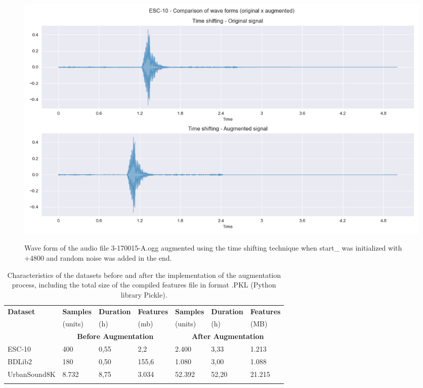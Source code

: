 \begin{figure}[htbp]
    \raggedright
        \caption{Wave form of the audio file 3-170015-A.ogg augmented using the time shifting technique when start\_ was initialized with +4800 and random noise was added in the end.}
        \includegraphics[width=1\textwidth]{resources/images/050-methods/Methods_augmentation_time_shifting.png}
        \label{fig:methods_augmentation_time_shifting}
\end{figure}

\begin{table}[ht!]
    \caption[Comparison between the original datasets and their augmented versions]{Characteristics of the datasets before and after the implementation of the augmentation process, including the total size of the compiled features file in format .PKL (Python library Pickle).}
    \label{table:summary_datasets_before_and_after_augmentation}
    \centering
    \begin{tabular}{p{2.7cm}|p{1.6cm}|p{1.7cm}|p{1.7cm}|p{1.6cm}|p{1.7cm}|p{1.7cm}}
        \Xhline{2\arrayrulewidth} 
        \rowcolor{lightgray}
        \textbf{Dataset} & \hfil\textbf{Samples} & \hfil\textbf{Duration} & \hfil\textbf{Features} & \hfil\textbf{Samples} & \hfil\textbf{Duration} & \hfil\textbf{Features}\\
        \rowcolor{lightgray}
          & \hfil (units) & \hfil (h) & \hfil (\gls{m}\gls{b}) & \hfil(units) & \hfil(h) & \hfil(MB)\\    
        \Xhline{2\arrayrulewidth}
        \rowcolor{gray!20} & \multicolumn{3}{c|}{\textbf{Before Augmentation}} & \multicolumn{3}{c}{\textbf{After Augmentation}} \\
        \hline
        ESC-10 & \hfil 400 & \hfil 0,55 & \hfil 2,2 & \hfil 2.400 & \hfil 3,33 & \hfil 1.213\\
        \hline
        BDLib2 & \hfil 180 & \hfil 0,50 & \hfil 155,6 & \hfil 1.080 & \hfil 3,00 & \hfil 1.088\\
        \hline
        UrbanSound8K & \hfil 8.732 & \hfil 8,75 & \hfil 3.034 & \hfil 52.392 & \hfil 52,20 & \hfil 21.215\\
        \Xhline{2\arrayrulewidth}
    \end{tabular}
\end{table}

